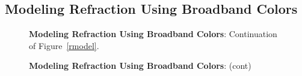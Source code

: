 \documentclass[DM,toc]{lsstdoc}
\begin{document}
\subsection{Modeling Refraction Using Broadband Colors \label{appx:rmodel}}
\begin{figure}[h]
    \centering
    \caption[]{\textbf{Modeling Refraction Using Broadband Colors}: Continuation of Figure~\ref{rmodel}.}
    \label{rmodel2}
\end{figure}
\begin{figure}
    \ContinuedFloat
    \centering
    \caption[]{\textbf{Modeling Refraction Using Broadband Colors}: (cont)}
    \label{rmodel2}
\end{figure}
\end{document}
